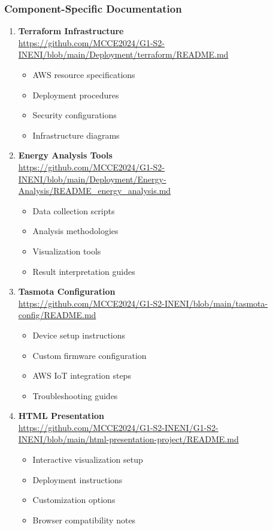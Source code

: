 \subsubsection{Component-Specific Documentation}
\begin{enumerate}
    \item \textbf{Terraform Infrastructure} \\
    \url{https://github.com/MCCE2024/G1-S2-INENI/blob/main/Deployment/terraform/README.md}
    \begin{itemize}
        \item AWS resource specifications
        \item Deployment procedures
        \item Security configurations
        \item Infrastructure diagrams
    \end{itemize}

    \item \textbf{Energy Analysis Tools} \\
    \url{https://github.com/MCCE2024/G1-S2-INENI/blob/main/Deployment/Energy-Analysis/README_energy_analysis.md}
    \begin{itemize}
        \item Data collection scripts
        \item Analysis methodologies
        \item Visualization tools
        \item Result interpretation guides
    \end{itemize}

    \item \textbf{Tasmota Configuration} \\
    \url{https://github.com/MCCE2024/G1-S2-INENI/blob/main/tasmota-config/README.md}
    \begin{itemize}
        \item Device setup instructions
        \item Custom firmware configuration
        \item AWS IoT integration steps
        \item Troubleshooting guides
    \end{itemize}

    \item \textbf{HTML Presentation} \\
    \url{https://github.com/MCCE2024/G1-S2-INENI/G1-S2-INENI/blob/main/html-presentation-project/README.md}
    \begin{itemize}
        \item Interactive visualization setup
        \item Deployment instructions
        \item Customization options
        \item Browser compatibility notes
    \end{itemize}
\end{enumerate}

